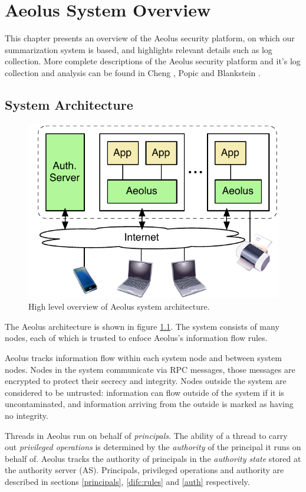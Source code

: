 \chapter{Aeolus System Overview}

This chapter presents an overview of the Aeolus security platform, on which our summarization system is based, and highlights relevant details such as log collection. More complete descriptions of the Aeolus security platform and it's log collection and analysis can be found in Cheng \cite{cheng}, Popic \cite{popic} and Blankstein \cite{blanks}.

\section{System Architecture}

\begin{figure}[ht]
\centering
\includegraphics[bb= 0 0 292 204, width=.5\textwidth]{figures/sysarch}
\caption{High level overview of Aeolus system architecture.}
\label{fig:aeolus-sysarch}
\end{figure}

The Aeolus architecture is shown in figure \ref{fig:aeolus-sysarch}. The system consists of many nodes, each of which is trusted to enfoce Aeolus's information flow rules.

Aeolus tracks information flow within each system node and between system nodes. Nodes in the system communicate via RPC messages, those messages are encrypted to protect their secrecy and integrity. Nodes outside the system are considered to be untrusted: information can flow outside of the system if it is uncontaminated, and information arriving from the outside is marked as having no integrity.


Threads in Aeolus run on behalf of \emph{principals}. The ability of a thread to carry out \emph{privileged operations} is determined by the \emph{authority} of the principal it runs on behalf of. Aeolus tracks the authority of principals in the \emph{authority state} stored at the authority server (AS). Principals, privileged operations and authority are described in sections \ref{principals}, \ref{difc:rules} and \ref{auth} respectively.

